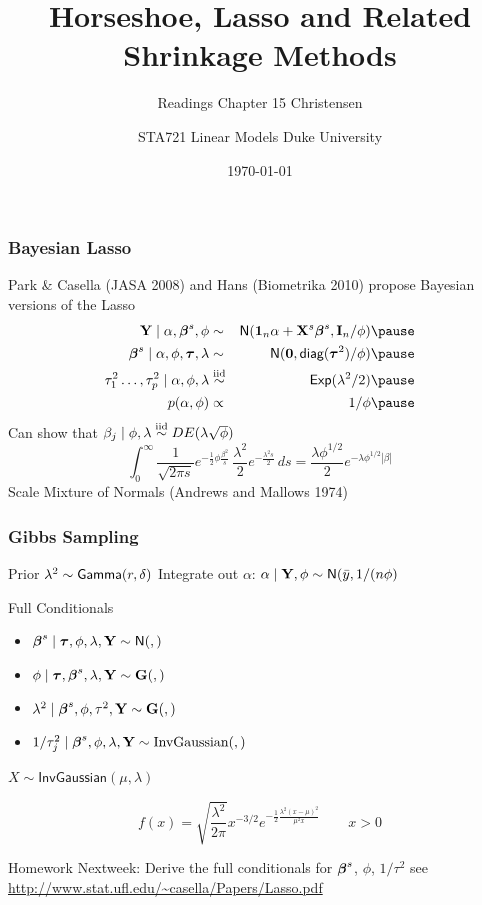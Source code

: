 \documentclass[]{beamer}
\title{Horseshoe, Lasso and Related Shrinkage Methods}
\subtitle{Readings Chapter 15 Christensen}
\institute{Merlise Clyde}
\author{STA721 Linear Models Duke University}
\date{\today}
\begin{document}
\maketitle
\begin{frame}
  \frametitle{Bayesian Lasso}
  Park \& Casella (JASA 2008) and Hans (Biometrika 2010) propose
  Bayesian versions of the Lasso  \pause
  \begin{eqnarray*}
    \Y \mid \alpha, \b^s, \phi & \sim & \N(\one_n \alpha + \X^s \b^s, \I_n/\phi)  \pause\\
    \b^s \mid \alpha, \phi, \taub, \lambda & \sim & \N(\zero, \diag(\taub^2)/\phi)  \pause\\
    \tau_1^2 \ldots, \tau_p^2 \mid \alpha, \phi, \lambda & \simiid & \Ex(\lambda^2/2)  \pause\\
    p(\alpha, \phi) & \propto& 1/\phi  \pause\\
  \end{eqnarray*}
Can show that $\beta_j \mid \phi, \lambda \mathrel{\mathop{\sim}\limits^{\rm iid}} DE(\lambda \sqrt{\phi})$
$$\int_0^\infty \frac{1}{\sqrt{2 \pi s}}
  e^{-\frac{1}{2} \phi \frac{\beta^2}{s }}
  \, \frac{\lambda^2}{2} e^{- \frac{\lambda^2 s}{2}}\, ds =
  \frac{\lambda \phi^{1/2}}{2} e^{-\lambda \phi^{1/2} |\beta|}
$$  \pause
Scale Mixture of Normals  (Andrews and Mallows 1974)
\end{frame}



\begin{frame}
  \frametitle{Gibbs Sampling}

Prior  $\lambda^2 \sim \textsf{Gamma}(r,\delta)$ \pause  Integrate out $\alpha$: $\alpha \mid \mathbf{Y}, \phi \sim \textsf{N}(\bar{y},     1/(n \phi)$  \pause

Full Conditionals
  \begin{itemize}
 \item $\boldsymbol{\beta}^s \mid \boldsymbol{\tau}, \phi, \lambda, \mathbf{Y} \sim \textsf{N}(, )$   \pause
\item $\phi \mid \boldsymbol{\tau}, \boldsymbol{\beta}^s, \lambda, \mathbf{Y} \sim \mathbf{G}( , ) $  \pause
\item $\lambda^2\mid  \boldsymbol{\beta}^s, \phi, \tau^2, \mathbf{Y} \sim \mathbf{G}( , )$ \pause
\item $1/\tau_j^2 \mid \boldsymbol{\beta}^s, \phi, \lambda, \mathbf{Y} \sim \text{InvGaussian}(
  , )$  \pause
 \end{itemize}
$X \sim \textsf{InvGaussian}(\mu,  \lambda)$

$$
f(x) =  \sqrt{\frac{\lambda^2}{2 \pi}}  x^{-3/2} e^{- \frac{1}{2} \frac{
    \lambda^2( x - \mu)^2} {\mu^2 x}} \qquad x > 0
$$  \pause

Homework Nextweek:  Derive the full conditionals for $\boldsymbol{\beta}^s$, $\phi$,
$1/\tau^2$  see \url{http://www.stat.ufl.edu/~casella/Papers/Lasso.pdf} 
\end{frame}
\end{document}
